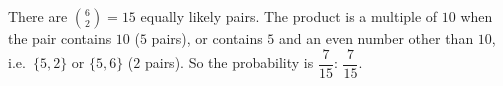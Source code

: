 There are $\binom62=15$ equally likely pairs. The product is a multiple of $10$ when the pair contains $10$ ($5$ pairs), or contains $5$ and an even number other than $10$, i.e.\ $\{5,2\}$ or $\{5,6\}$ ($2$ pairs). So the probability is $\dfrac{7}{15}$: $\boxed{\dfrac{7}{15}}$.
